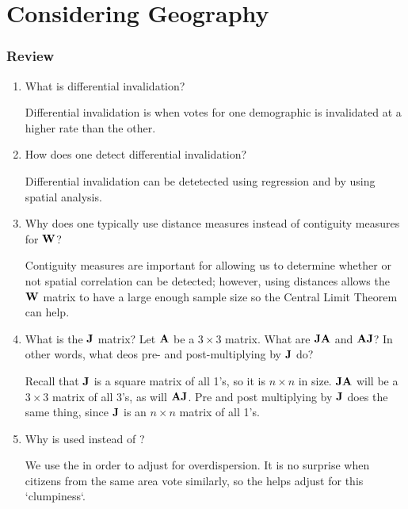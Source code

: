 \chapter{Considering Geography}\label{ch:geo}
\subsection*{Review}
\begin{enumerate}

 \item What is differential invalidation?
\begin{solution}
Differential invalidation is when votes for one demographic is invalidated at a higher rate than the other.
\end{solution}
 
 \item How does one detect differential invalidation?
\begin{solution}
Differential invalidation can be detetected using regression and by using spatial analysis. 
\end{solution}
 
 \item Why does one typically use distance measures instead of contiguity measures for $\mathbf{W}$?
\begin{solution}
Contiguity measures are important for allowing us to determine whether or not spatial correlation can be detected; however, using distances allows the $\mathbf{W}$ matrix to have a large enough sample size so the Central Limit Theorem can help. 
\end{solution}
 
 \item What is the $\mathbf{J}$ matrix? Let $\mathbf{A}$ be a $3 \times 3$ matrix. What are $\mathbf{JA}$ and $\mathbf{AJ}$? In other words, what deos pre- and post-multiplying by $\mathbf{J}$ do?
\begin{solution}
Recall that $\mathbf{J}$ is a square matrix of all 1's, so it is $n \times n$ in size.  $\mathbf{JA}$ will be a $3 \times 3$ matrix of all 3's, as will $\mathbf{AJ}$. Pre and post multiplying by $\mathbf{J}$ does the same thing, since $\mathbf{J}$ is an $n \times n$ matrix of all 1's. 
\end{solution}
 
 \item Why is  used instead of ?
\begin{solution}
We use the  in order to adjust for overdispersion. It is no surprise when citizens from the same area vote similarly, so the  helps adjust for this `clumpiness`. 
\end{solution}
 

\end{enumerate}
